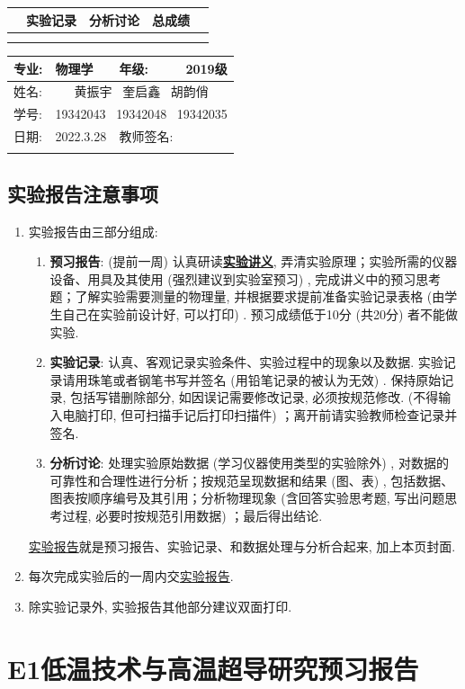 \documentclass{ctexart}                                     %
\title{\experimentname}
\author{\stuID \student}
\date{\today}
\newcommand{\experimentname}{E1低温技术与高温超导研究}
\newcommand{\student}{黄振宇  \ 奎启鑫 \ 胡韵俏}
\newcommand{\Grade}{2019级}
\newcommand{\stuID}{19342043  \ 19342048 \ 19342035}
\newcommand{\previewdate}{2022.3.28}
\newcommand{\inlinemaketitle}{{\let\newpage\relax\maketitle}}
\theoremstyle{ansstyle}
\newcommand{\infotable}{%
	\begin{center}
		\begin{tabular}{|p{1.49cm}<{\centering}|p{1.49cm}<{\centering}|p{1.49cm}<{\centering}|p{1.49cm}<{\centering}|p{1.49cm}<{\centering}|p{1.49cm}<{\centering}|p{1.49cm}<{\centering}|p{1.49cm}<{\centering}|}
			\specialrule{0em}{0.3cm}{0cm}
			\hline
			\multicolumn{2}{|c|}{\LARGE 预习实验} & \multicolumn{2}{c|}{\LARGE 实验记录}& \multicolumn{2}{c|}{\LARGE 分析讨论} & \multicolumn{2}{c|}{\LARGE 总成绩} \\
			\hline
			&&&&&&& \\
			\hline
			\specialrule{0em}{0.3cm}{0cm}
		\end{tabular}
	\end{center}%
}
\newcommand{\previewdata}{%
	\begin{center}
		\begin{tabular}{|p{1.5cm}|p{4.5cm}|p{4cm}|p{3.65cm}|}
			\hline
			{\large 专业}:  & {\large 物理学}    & {\large 年级: }    & {\large \Grade} \\
			\hline
			{\large 姓名: } & \multicolumn{3}{c|}{\large \student} \\
			\hline
			{\large 学号: }  & \multicolumn{3}{c|}{\large \stuID} \\
			\hline
			{\large 日期: } & {\large \previewdate} & {\large 教师签名: } & \\
			\hline
			\specialrule{0em}{0.6cm}{0cm}
		\end{tabular}
	\end{center}%
}
\begin{document}
\noindent
\renewcommand\arraystretch{1.8}
\infotable

\renewcommand\arraystretch{1.3}
\previewdata

\inlinemaketitle
\tableofcontents

\subsection{实验报告注意事项}

\begin{enumerate}
    \item 实验报告由三部分组成:
          \begin{enumerate}
              \item \textbf{预习报告}:
                    (提前一周) 认真研读\underline{\textbf{实验讲义}}, 弄清实验原理；实验所需的仪器设备、用具及其使用 (强烈建议到实验室预习) , 完成讲义中的预习思考题；了解实验需要测量的物理量, 并根据要求提前准备实验记录表格 (由学生自己在实验前设计好, 可以打印) . 预习成绩低于10分 (共20分) 者不能做实验.
              \item \textbf{实验记录}:
                    认真、客观记录实验条件、实验过程中的现象以及数据. 实验记录请用珠笔或者钢笔书写并签名 ({\color{red}用铅笔记录的被认为无效}) . {\color{red}保持原始记录, 包括写错删除部分, 如因误记需要修改记录, 必须按规范修改. } (不得输入电脑打印, 但可扫描手记后打印扫描件) ；离开前请实验教师检查记录并签名.
              \item \textbf{分析讨论}:
                    处理实验原始数据 (学习仪器使用类型的实验除外) , 对数据的可靠性和合理性进行分析；按规范呈现数据和结果 (图、表) , 包括数据、图表按顺序编号及其引用；分析物理现象 (含回答实验思考题, 写出问题思考过程, 必要时按规范引用数据) ；最后得出结论.
          \end{enumerate}
          \underline{实验报告}就是预习报告、实验记录、和数据处理与分析合起来, 加上本页封面.
    \item 每次完成实验后的一周内交\underline{实验报告}.
    \item 除实验记录外, 实验报告其他部分建议双面打印.
\end{enumerate}


\section*{\experimentname 预习报告}
\end{document}
